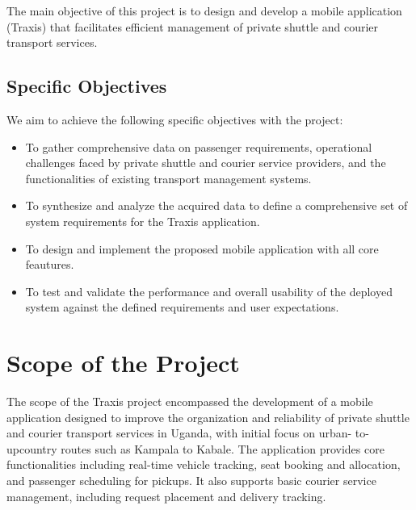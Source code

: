 The main objective of this project is to design and develop a mobile application
(Traxis) that facilitates efficient management of private shuttle and courier
transport services.

\subsection{Specific Objectives}
We aim to achieve the following specific objectives with the project:

\begin{itemize}
 \item[i.]  To gather comprehensive data on passenger requirements,
        operational challenges faced by private shuttle and courier service
        providers, and the functionalities of existing transport management
        systems.

 \item[ii.]To synthesize and analyze the acquired data to define a
        comprehensive set of system requirements for the Traxis application.


 \item[iii.] To design and implement the proposed mobile application with
        all core feautures.

 \item[iv.]
To test and validate the performance and overall usability of the deployed
system against the defined requirements and user expectations.


\end{itemize}
\vspace{1cm}

\section{Scope of the Project}
The scope of the Traxis project encompassed the development of a mobile
application designed to improve the organization and reliability of private
shuttle and courier transport services in Uganda, with initial focus on urban-
to-upcountry routes such as Kampala to Kabale. The application provides core
functionalities including real-time vehicle tracking, seat booking and
allocation, and passenger scheduling for pickups. It also supports basic courier
service management, including request placement and delivery tracking.


